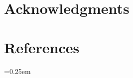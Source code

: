 \documentclass[a4paper, 12pt]{article}
\begin{document}


\newpage
\section{Acknowledgments}



\newpage
\section{References}

\emergencystretch=0.25em
\printbibliography[heading=none]

\newpage
\end{document}
